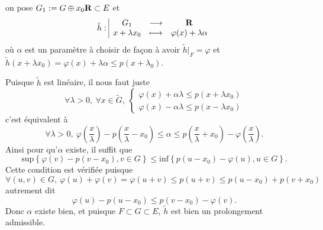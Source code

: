 \documentclass[a4paper,11pt, twoside]{article}
\begin{document}
\begin{Proof}
  on pose $G_1:= G\oplus x_0\mathbf R\subset E$ et 
  $$\tilde h:\begin{array}{|ccc}
    G_1&\longrightarrow&\mathbf R\\
    x+\lambda x_0&\longmapsto&\varphi(x)+\lambda\alpha
  \end{array}$$
  où $\alpha$ est un paramètre à choisir de façon à avoir $\tilde h\big|_F=\varphi$ et $\tilde h(x+\lambda x_0)=\varphi(x)+\lambda\alpha\leqslant p(x+\lambda _0)$. 


  Puisque $\tilde h$ est linéaire, il nous faut \og juste\fg\ 
  $$\forall \lambda>0,\ \forall x\in \tilde G,\ \begin{cases}
    \varphi(x)+\alpha\lambda\leqslant p(x+\lambda x_0)\\
    \varphi(x)-\alpha\lambda\leqslant p(x-\lambda x_0)
  \end{cases}$$
  c'est équivalent à 
  $$\forall \lambda>0,\ \varphi\left(\frac{x}{\lambda}\right)-p\left(\frac{x}{\lambda}-x_0\right)\leqslant \alpha\leqslant p\left(\frac{x}{\lambda}+x_0\right)-\varphi\left(\frac{x}{\lambda}\right).$$
  Ainsi pour qu'$\alpha$ existe, il suffit que 
  $$\mathrm{sup}\left\{\varphi\left(v\right)-p\left(v-x_0\right), v\in G\right\}\leqslant \mathrm{inf}\left\{p\left(u-x_0\right)-\varphi\left(u\right), u\in G\right\}.$$
  Cette condition est vérifiée puisque 
  $$\forall (u,v)\in G,\ \varphi(u)+\varphi(v)=\varphi(u+v)\leqslant p(u+v)\leqslant p(u-x_0)+p(v+x_0)$$
  autrement dit 
  $$\varphi(u)-p(u-x_0)\leqslant p(v-x_0)-\varphi(v).$$
  Donc $\alpha$ existe bien, et puisque $F\subset G\subset E$, $\tilde h$ est bien un prolongement admissible.
\end{Proof}
\end{document}
